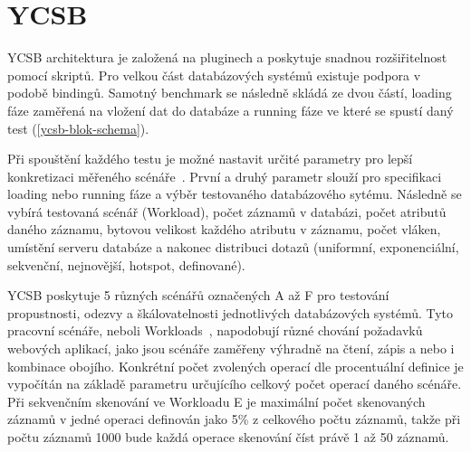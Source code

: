 \documentclass[czech,master,dept460,male,csharp,cpdeclaration]{diploma}
\begin{document}
	\section{YCSB} \label{lab-ycsb}
	
	YCSB architektura je založená na pluginech a poskytuje snadnou rozšiřitelnost pomocí skriptů. Pro velkou část databázových systémů existuje podpora v podobě bindingů. Samotný benchmark se následně skládá ze dvou částí, loading fáze zaměřená na vložení dat do databáze a running fáze ve které se spustí daný test (\ref{ycsb-blok-schema}).
	
	Při spouštění každého testu je možné nastavit určité parametry pro lepší konkretizaci měřeného scénáře~\cite{ytb-ycsb}. První a druhý parametr slouží pro specifikaci loading nebo running fáze a výběr testovaného databázového sytému. Následně se vybírá testovaná scénář (Workload), počet záznamů v databázi, počet atributů daného záznamu, bytovou velikost každého atributu v záznamu, počet vláken, umístění serveru databáze a nakonec distribuci dotazů (uniformní, exponenciální, sekvenční, nejnovější, hotspot, definované).
	
	YCSB poskytuje 5 různých scénářů označených A až F pro testování propustnosti, odezvy a škálovatelnosti jednotlivých databázových systémů. Tyto pracovní scénáře, neboli Workloads~\cite{benchmark-pdf-1, workloads}, napodobují různé chování požadavků webových aplikací, jako jsou scénáře zaměřeny výhradně na čtení, zápis a nebo i kombinace obojího. Konkrétní počet zvolených operací dle procentuální definice je vypočítán na základě parametru určujícího celkový počet operací daného scénáře. Při sekvenčním skenování ve Workloadu E je maximální počet skenovaných záznamů v jedné operaci definován jako 5\% z celkového počtu záznamů, takže při počtu záznamů 1000 bude každá operace skenování číst právě 1 až 50 záznamů.
	
\end{document}
